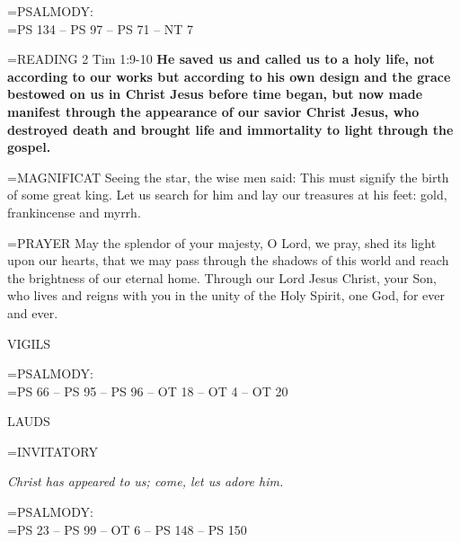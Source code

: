 \hangindent=\parindent \small{PSALMODY:}\\
\hangindent=\parindent  PS 134 -- PS 97 -- PS 71 -- NT 7\vspace{0.5em}


\hangindent=\parindent \small{\uppercase{READING}}    2 Tim 1:9-10 \textbf{   He saved us and called us to a holy life, not according to our works but according to his own design and the grace bestowed on us in Christ Jesus before time began, but now made manifest through the appearance of our savior Christ Jesus, who destroyed death and brought life and immortality to light through the gospel.\\}

\hangindent=\parindent \small{MAGNIFICAT 	Seeing the star, the wise men said: This must signify the birth of some great king. Let us search for him and lay our treasures at his feet: gold, frankincense and myrrh.\\}

\hangindent=\parindent \small{PRAYER 	May the splendor of your majesty, O Lord, we pray, shed its light upon our hearts, that we may pass through the shadows of this world and reach the brightness of our eternal home. Through our Lord Jesus Christ, your Son, who lives and reigns with you in the unity of the Holy  Spirit, one God, for ever and ever.}

\begin{flushleft}\normalsize VIGILS\\\end{flushleft}

\hangindent=\parindent \small{PSALMODY:}\\
\hangindent=\parindent  PS 66 -- PS 95 -- PS 96 -- OT 18 -- OT 4 -- OT 20\vspace{0.5em}

\begin{flushleft}\normalsize LAUDS\\\end{flushleft}

\hangindent=\parindent \small{INVITATORY}
\begin{center}
\textit{Christ has appeared to us; come, let us adore him.\\}
\end{center}

\hangindent=\parindent \small{PSALMODY:}\\
\hangindent=\parindent  PS 23 -- PS 99 -- OT 6 -- PS 148 -- PS 150\vspace{0.5em}

